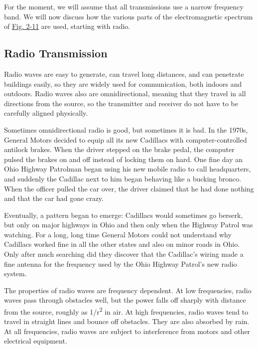 \documentclass[b5paper,11pt]{memoir}
\begin{document}
For the moment, we will assume that all transmissions use a narrow
frequency band. We will now discuss how the various parts of the
electromagnetic spectrum of
\protect\hyperlink{0130661023_ch02lev1sec3.htmlux5cux23ch02fig11}{Fig.
2-11} are used, starting with radio.

\protect\hypertarget{0130661023_ch02lev1sec3.htmlux5cux23ch02lev2sec9}{}{}

\subsection{Radio Transmission}

Radio waves are easy to generate, can travel long distances, and can
penetrate buildings easily, so they are widely used for communication,
both indoors and outdoors. Radio waves also are omnidirectional, meaning
that they travel in all directions from the source, so the transmitter
and receiver do not have to be carefully aligned physically.

Sometimes omnidirectional radio is good, but sometimes it is bad. In the
1970s, General Motors decided to equip all its new Cadillacs with
computer-controlled antilock brakes. When the driver stepped on the
brake pedal, the computer pulsed the brakes on and off instead of
locking them on hard. One fine day an Ohio Highway Patrolman began using
his new mobile radio to call headquarters, and suddenly the Cadillac
next to him began behaving like a bucking bronco. When the officer
pulled the car over, the driver claimed that he had done nothing and
that the car had gone crazy.

Eventually, a pattern began to emerge: Cadillacs would sometimes go
berserk, but only on major highways in Ohio and then only when the
Highway Patrol was watching. For a long, long time General Motors could
not understand why Cadillacs worked fine in all the other states and
also on minor roads in Ohio. Only after much searching did they discover
that the Cadillac's wiring made a fine antenna for the frequency used by
the Ohio Highway Patrol's new radio system.

The properties of radio waves are frequency dependent. At low
frequencies, radio waves pass through obstacles well, but the power
falls off sharply with distance from the source, roughly as
1{/r}\textsuperscript{2} in air. At high frequencies, radio waves tend
to travel in straight lines and bounce off obstacles. They are also
absorbed by rain. At all frequencies, radio waves are subject to
interference from motors and other electrical equipment.
\end{document}
